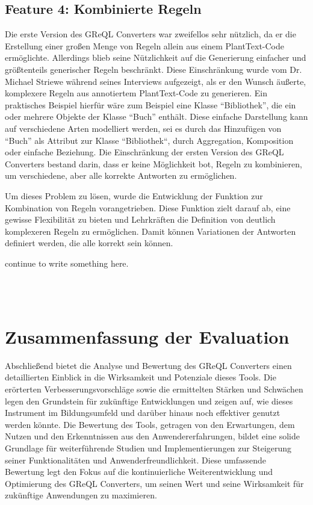 \subsection{Feature 4: Kombinierte Regeln}

Die erste Version des GReQL Converters war zweifellos sehr nützlich, da er die Erstellung einer großen Menge von Regeln
allein aus einem PlantText-Code ermöglichte. Allerdings blieb seine Nützlichkeit auf die Generierung einfacher und
größtenteils generischer Regeln beschränkt. Diese Einschränkung wurde vom Dr. Michael Striewe während seines Interviews
aufgezeigt, als er den Wunsch äußerte, komplexere Regeln aus annotiertem PlantText-Code zu generieren. Ein praktisches
Beispiel hierfür wäre zum Beispiel eine Klasse ``Bibliothek'', die ein oder mehrere Objekte der Klasse ``Buch'' enthält.
Diese einfache Darstellung kann auf verschiedene Arten modelliert werden, sei es durch das Hinzufügen von ``Buch'' als
Attribut zur Klasse ``Bibliothek``, durch Aggregation, Komposition oder einfache Beziehung. Die Einschränkung der ersten
Version des GReQL Converters bestand darin, dass er keine Möglichkeit bot, Regeln zu kombinieren, um verschiedene, aber
alle korrekte Antworten zu ermöglichen.

Um dieses Problem zu lösen, wurde die Entwicklung der Funktion zur Kombination von Regeln vorangetrieben. Diese Funktion
zielt darauf ab, eine gewisse Flexibilität zu bieten und Lehrkräften die Definition von deutlich komplexeren Regeln zu
ermöglichen. Damit können Variationen der Antworten definiert werden, die alle korrekt sein können.

continue to write something here.

\\~\\


\section{Zusammenfassung der Evaluation}

Abschließend bietet die Analyse und Bewertung des GReQL Converters einen detaillierten Einblick in die Wirksamkeit und
Potenziale dieses Tools. Die erörterten Verbesserungsvorschläge sowie die ermittelten Stärken und Schwächen legen den
Grundstein für zukünftige Entwicklungen und zeigen auf, wie dieses Instrument im Bildungsumfeld und darüber hinaus noch
effektiver genutzt werden könnte. Die Bewertung des Tools, getragen von den Erwartungen, dem Nutzen und den
Erkenntnissen aus den Anwendererfahrungen, bildet eine solide Grundlage für weiterführende Studien und Implementierungen
zur Steigerung seiner Funktionalitäten und Anwenderfreundlichkeit. Diese umfassende Bewertung legt den Fokus auf die
kontinuierliche Weiterentwicklung und Optimierung des GReQL Converters, um seinen Wert und seine Wirksamkeit für
zukünftige Anwendungen zu maximieren.
